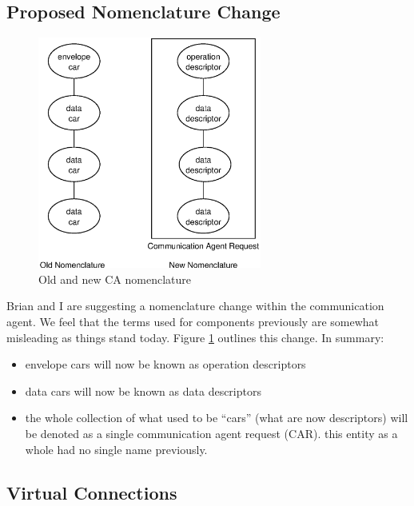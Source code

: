 \documentclass[11pt,letterpaper]{article}
\begin{document}

\subsection{Proposed Nomenclature Change}

\begin{figure}
\begin{center}
\includegraphics[height=3in]{ca-nomenclature.eps}
\caption{\label{fig:ca-nomenclature} Old and new CA nomenclature}
\end{center}
\end{figure}


Brian and I are suggesting a nomenclature change within the communication
agent.  We feel that the terms used for components previously are somewhat
misleading as things stand today.  Figure \ref{fig:ca-nomenclature} outlines
this change.  In summary:
\begin{itemize}
\item envelope cars will now be known as operation descriptors
\item data cars will now be known as data descriptors
\item the whole collection of what used to be ``cars'' (what are now
  descriptors) will be denoted as a single communication agent request (CAR).
  this entity as a whole had no single name previously.
\end{itemize}


\subsection{Virtual Connections}
\end{document}
